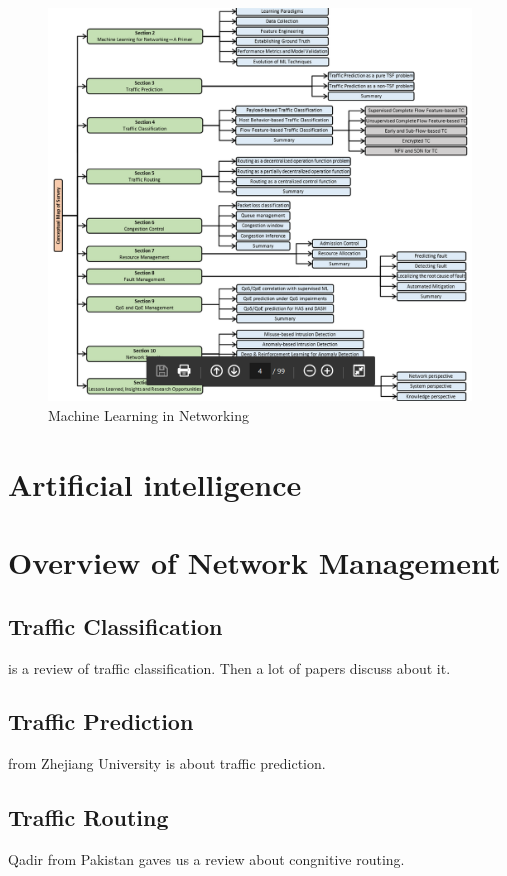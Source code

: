 \documentclass[journal,UTF8]{IEEEtran}
\begin{document}
 \begin{figure}
	\centering
	\includegraphics{fig/MLinN.png}
	\caption{Machine Learning in Networking}
	\label{fig:MLinN}
\end{figure}


\section{Artificial intelligence}
\section{Overview of Network Management}
\subsection{Traffic Classification}
\cite{Williams2006A} is a review of traffic classification. Then a lot of papers\cite{Jin2012A,Huang2012On,Soysal2010Machine} discuss about it.
\subsection{Traffic Prediction}
\cite{Hua2017Traffic} from Zhejiang University is about traffic prediction.
\subsection{Traffic Routing}
Qadir\cite{Qadir2016Artificial} from Pakistan gaves us a review about congnitive routing.
\cite{Hui2002Reinforcement}
\end{document}
